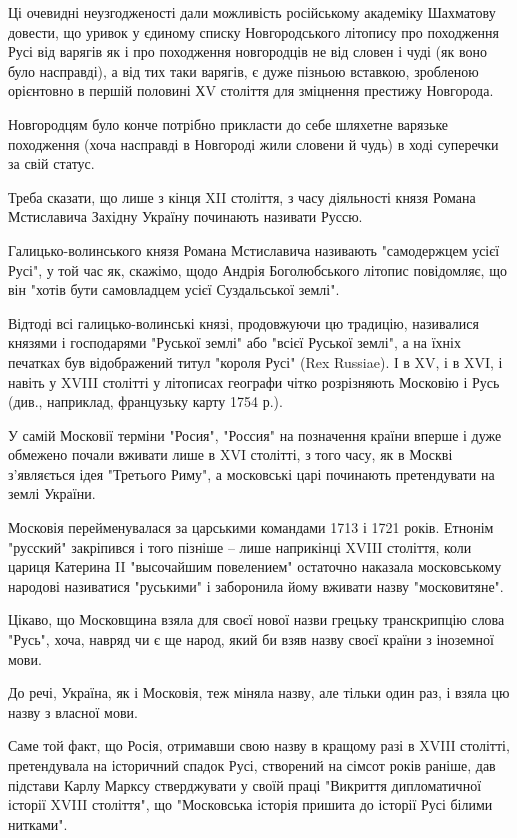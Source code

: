 Ці очевидні неузгодженості дали можливість російському академіку Шахматову
довести, що уривок у єдиному списку Новгородського літопису про походження Русі
від варягів як і про походження новгородців не від словен і чуді (як воно було
насправді), а від тих таки варягів, є дуже пізньою вставкою, зробленою
орієнтовно в першій половині ХV століття для зміцнення престижу Новгорода.

Новгородцям було конче потрібно прикласти до себе шляхетне варязьке походження
(хоча насправді в Новгороді жили словени й чудь) в ході суперечки за свій
статус.

Треба сказати, що лише з кінця XII століття, з часу діяльності князя Романа
Мстиславича Західну Україну починають називати Руссю.

Галицько-волинського князя Романа Мстиславича називають "самодержцем усієї
Русі", у той час як, скажімо, щодо Андрія Боголюбського літопис повідомляє, що
він "хотів бути самовладцем усієї Суздальської землі".

Відтоді всі галицько-волинські князі, продовжуючи цю традицію, називалися
князями і господарями "Руської землі" або "всієї Руської землі", а на їхніх
печатках був відображений титул "короля Русі" (Rex Russiae). І в XV, і в XVI, і
навіть у XVIII столітті у літописах географи чітко розрізняють Московію і Русь
(див., наприклад, французьку карту 1754 р.).

У самій Московії терміни "Росия", "Россия" на позначення країни вперше і дуже
обмежено почали вживати лише в XVI столітті, з того часу, як в Москві
з'являється ідея "Третього Риму", а московські царі починають претендувати на
землі України.

Московія перейменувалася за царськими командами 1713 і 1721 років. Етнонім
"русский" закріпився і того пізніше – лише наприкінці XVIII століття, коли
цариця Катерина II "высочайшим повелением" остаточно наказала московському
народові називатися "руськими" і заборонила йому вживати назву "московитяне".

Цікаво, що Московщина взяла для своєї нової назви грецьку транскрипцію слова
"Русь", хоча, навряд чи є ще народ, який би взяв назву своєї країни з іноземної
мови.

До речі, Україна, як і Московія, теж міняла назву, але тільки один раз, і взяла
цю назву з власної мови.

Саме той факт, що Росія, отримавши свою назву в кращому разі в XVIIІ столітті,
претендувала на історичний спадок Русі, створений на сімсот років раніше, дав
підстави Карлу Марксу стверджувати у своїй праці "Викриття дипломатичної
історії XVIII століття", що "Московська історія пришита до історії Русі білими
нитками".

